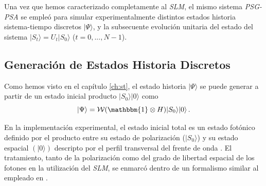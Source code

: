 Una vez que hemos caracterizado completamente al {\it SLM},
el mismo sistema {\it PSG-PSA} se empleó para simular experimentalmente distintos estados
historia sistema-tiempo discretos 
$|\Psi\rangle$, 
y la subsecuente  evolución unitaria del estado del sistema $|S_t\rangle=U_{t}|S_0\rangle$ 
($t=0,...,N-1$). 


\subsection{\label{sec:state_generation} Generación de Estados Historia Discretos}

Como hemos visto en el capítulo \ref{ch:st}, el estado historia 
$|\Psi\rangle$ se puede generar a partir de un estado inicial producto $|S_0\rangle|0\rangle$ 
como
\begin{equation}\label{Eq:histGen}
    |\Psi\rangle=\mathcal{W}(\mathbbm{1}\otimes H)|S_0\rangle|0\rangle \,.
\end{equation}


En la implementación experimental, 
el estado inicial total es un estado fotónico definido por 
el producto entre su estado de polarización ($|S_0\rangle$)
y su estado espacial $(|0\rangle)$ 
descripto por el perfil transversal del frente de onda .
El tratamiento, tanto de la polarización como del grado de libertad espacial de los fotones en la utilización del {\it SLM}, se enmarcó dentro de un formalismo similar al empleado en \cite{solis2013,lemos2014}. 


